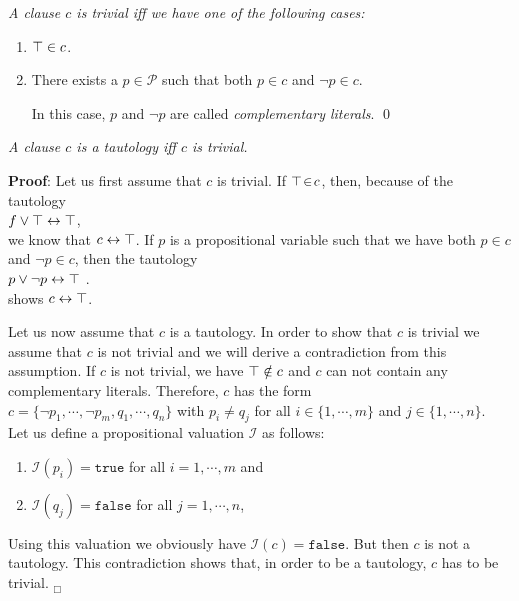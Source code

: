\begin{Definition}
{\em 
A clause $c$ is \emph{trivial} iff we have one of the following cases:
\begin{enumerate}
\item $\top \in c$.
\item There exists a $p \in \mathcal{P}$ such that both $p \in c$ and $\neg p \in c$.

      In this case,  $p$ and $\neg p$ are called \emph{complementary literals}.
 \qed
\end{enumerate}
} 
\end{Definition}

\begin{Proposition} \label{satz:trivial}
{\em
A clause $c$ is a tautology iff $c$ is trivial.}
\end{Proposition}
\textbf{Proof}:  Let us first assume that  $c$ is trivial.
If  $\top \!\in\! c$, then, because of the tautology
\\[0.2cm]
\hspace*{1.3cm}
$f \vee \top \leftrightarrow \top$,
\\[0.2cm]
we know that $c \leftrightarrow \top$.   If $p$ is a propositional variable such that we have both
$p \in c$ and $\neg p \in c$, then the tautology 
\\[0.2cm]
\hspace*{1.3cm}
 $p \vee \neg p \leftrightarrow \top$ .
\\[0.2cm]
shows  $c \leftrightarrow \top$.

Let us now assume that  $c$ is a tautology.  In order to show that $c$ is trivial we assume
that $c$ is not trivial and we will derive a contradiction from this assumption.
If $c$ is not trivial, we have $\top \notin c$ and
$c$ can not contain any complementary literals.
Therefore, $c$ has the form
\\[0.2cm]
\hspace*{1.3cm} 
$c = \{ \neg p_1, \cdots, \neg p_m, q_1, \cdots, q_n \}$ \quad with $p_i
\not= q_j$ for all $i \in \{ 1,\cdots,m\}$ and $j \in \{1, \cdots, n\}$.
\\[0.2cm]
Let us define a propositional valuation $\mathcal{I}$ as follows:
\begin{enumerate}
\item $\mathcal{I}(p_i) = \mathtt{true}$ for all $i = 1, \cdots, m$ and
\item $\mathcal{I}(q_j) = \mathtt{false}$ for all $j = 1, \cdots, n$,
\end{enumerate}
Using this valuation we obviously have $\mathcal{I}(c) = \mathtt{false}$.  But then $c$ is not a
tautology.  This contradiction shows that, in order to be a tautology, $c$ has to be trivial.
\hspace*{\fill}  $_\Box$

